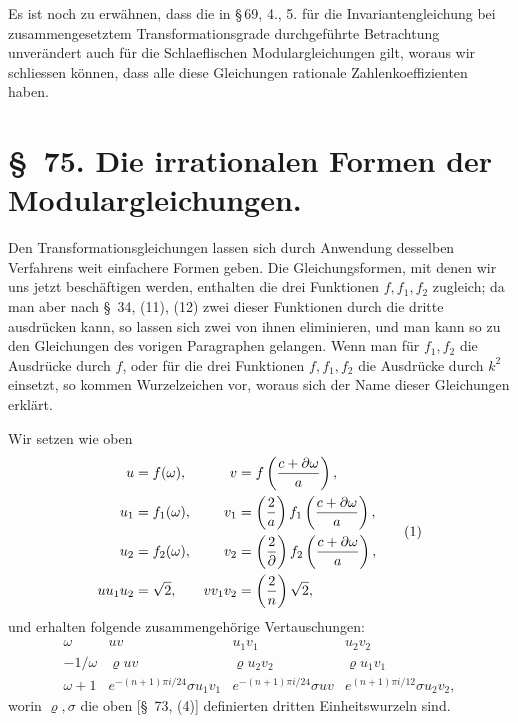 \documentclass[11pt]{article}
\begin{document}
Es ist noch zu erwähnen, dass die in \S\,69, 4., 5. für die Invariantengleichung bei zusammengesetztem Transformationsgrade durchgeführte Betrachtung unverändert auch für die Schlaeflischen Modulargleichungen gilt, woraus wir schliessen können, dass alle diese Gleichungen rationale Zahlenkoeffizienten haben.

\clearpage

\section*{\S~75. Die irrationalen Formen der Modulargleichungen.}

Den Transformationsgleichungen lassen sich durch Anwendung desselben Verfahrens weit einfachere Formen geben. Die Gleichungsformen, mit denen wir uns jetzt beschäftigen werden, enthalten die drei Funktionen $f,f_1,f_2$ zugleich; da man aber nach \S~34, (11), (12) zwei dieser Funktionen durch die dritte ausdrücken kann, so lassen sich zwei von ihnen eliminieren, und man kann so zu den Gleichungen des vorigen Paragraphen gelangen. Wenn man für $f_1,f_2$ die Ausdrücke durch $f$, oder für die drei Funktionen $f,f_1,f_2$ die Ausdrücke durch $k^2$ einsetzt, so kommen Wurzelzeichen vor, woraus sich der Name dieser Gleichungen erklärt.

Wir setzen wie oben
\begin{equation}
\begin{aligned}
u&=f(\omega),& v&=f\left({c+\partial\omega\over a}\right),\\
u_1&=f_1(\omega),& v_1&=\left({2\over a}\right)f_1\left({c+\partial\omega\over a}\right),\\
u_2&=f_2(\omega),& v_2&=\left({2\over\partial}\right)f_2\left({c+\partial\omega\over a}\right),\\
u u_1u_2&=\sqrt2,& vv_1v_2&=\left({2\over n}\right)\sqrt2,
\end{aligned}
\tag{1}
\end{equation}
und erhalten folgende zusammengehörige Vertauschungen:
\begin{equation}
\begin{array}{c|ccc}
\omega&uv&u_1v_1&u_2v_2\\[0.2em]
-1/\omega&\varrho uv&\varrho u_2v_2&\varrho u_1v_1\\[0.2em]
\omega+1&e^{-(n+1)\pi i/24}\sigma u_1v_1&e^{-(n+1)\pi i/24}\sigma uv&e^{(n+1)\pi i/12}\sigma u_2v_2,
\end{array}
\tag{2}
\end{equation}
worin $\varrho,\sigma$ die oben [\S~73, (4)] definierten dritten Einheitswurzeln sind.
\end{document}
